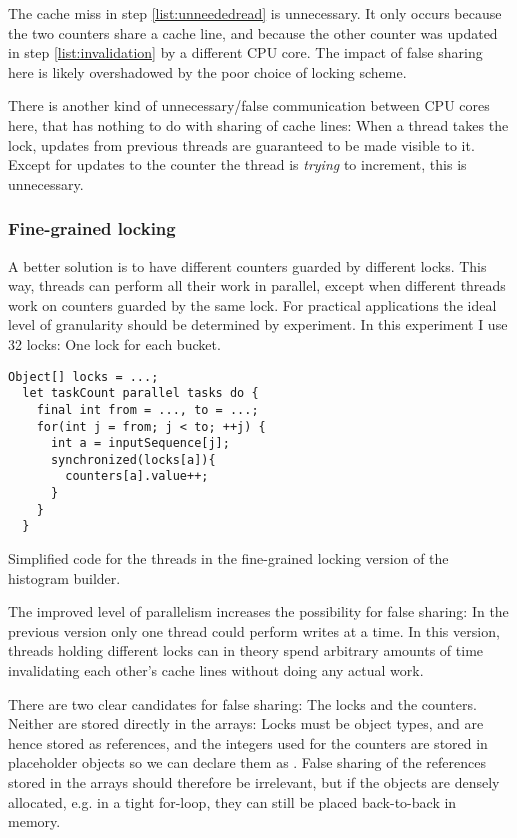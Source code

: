 The cache miss in step \ref{list:unneededread} is unnecessary. It only occurs
because the two counters share a cache line, and because the other counter was
updated in step \ref{list:invalidation} by a different CPU core. The impact of
false sharing here is likely overshadowed by the poor choice of locking scheme.

There is another kind of unnecessary/false communication between CPU cores here,
that has nothing to do with sharing of cache lines: When a thread takes the
lock, updates from previous threads are guaranteed to be made visible to it.
Except for updates to the counter the thread is \textit{trying} to increment,
this is unnecessary.

\subsubsection{Fine-grained locking}
\label{sec:fine-grained-histo}
A better solution is to have different counters guarded by different locks. This
way, threads can perform all their work in parallel, except when different
threads work on counters guarded by the same lock. For practical applications
the ideal level of granularity should be determined by experiment. In this
experiment I use 32 locks: One lock for each bucket.

\begin{code}
\begin{Verbatim}[frame=single]
  Object[] locks = ...;
  let taskCount parallel tasks do {
    final int from = ..., to = ...;
    for(int j = from; j < to; ++j) {
      int a = inputSequence[j];
      synchronized(locks[a]){
        counters[a].value++;
      }
    }
  }
\end{Verbatim}
	\caption{Simplified code for the threads in the fine-grained locking
	version of the histogram builder.}
\end{code}

The improved level of parallelism increases the possibility for false sharing: In
the previous version only one thread could perform writes at a time. In this
version, threads holding different locks can in theory spend arbitrary amounts
of time invalidating each other's cache lines without doing any actual work.

There are two clear candidates for false sharing: The locks and the counters.
Neither are stored directly in the arrays: Locks must be object types, and are
hence stored as references, and the integers used for the counters are stored in
placeholder objects so we can declare them as . False sharing of
the references stored in the arrays should therefore be irrelevant, but if the
objects are densely allocated, e.g. in a tight for-loop, they can still be
placed back-to-back in memory.

